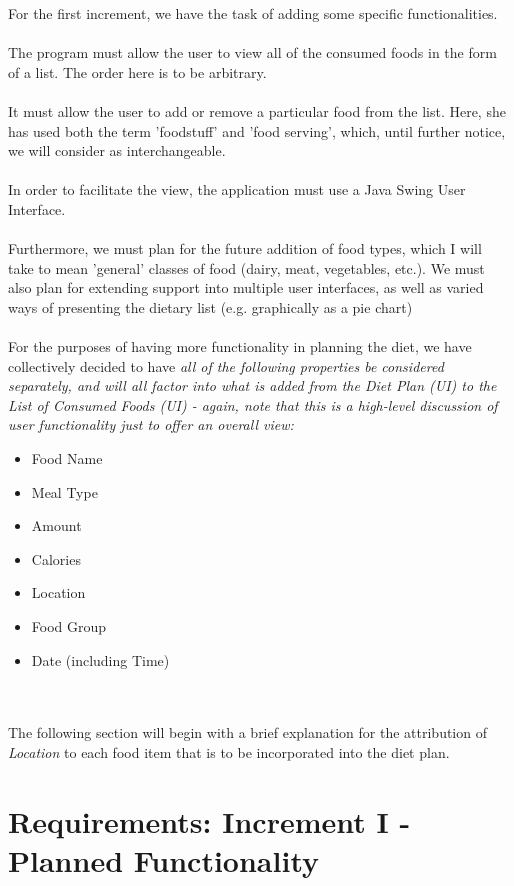 \documentclass{article}
\begin{document}
For the first increment, we have the task of adding some specific functionalities.
\\\\
The program must allow the user to view all of the consumed foods in the form of a list. The order here is to be arbitrary.
\\\\
It must allow the user to add or remove a particular food from the list. Here, she has used both the term 'foodstuff' and 'food serving', which, until further notice, we will consider as interchangeable.
\\\\
In order to facilitate the view, the application must use a Java Swing User Interface.
\\\\
Furthermore, we must plan for the future addition of food types, which I will take to mean 'general' classes of food (dairy, meat, vegetables, etc.). We must also plan for extending support into multiple user interfaces, as well as varied ways of presenting the dietary list (e.g. graphically as a pie chart)
\\\\
For the purposes of having more functionality in planning the diet, we have collectively decided to have \em all \em of the following properties be considered separately, and will all factor into what is added from the \textit{Diet Plan} (UI) to the \textit{List of Consumed Foods} (UI) - again, note that this is a high-level discussion of user functionality just to offer an overall view:

\begin{itemize}
    \item Food Name
    \item Meal Type
    \item Amount
    \item Calories
    \item Location
    \item Food Group
    \item Date (including Time)
\end{itemize}
\\\\
The following section will begin with a brief explanation for the attribution of \textit{Location} to each food item that is to be incorporated into the diet plan.
\\
\section{Requirements: Increment I - Planned Functionality}
\end{document}
